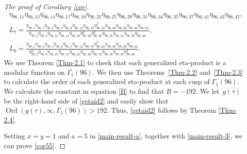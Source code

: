 \documentclass[10pt,a4paper]{amsart}
\numberwithin{equation}{section}
\theoremstyle{definition}
\begin{document}
\begin{proof}[The proof of Corollary \ref{cor}]
\begin{gather*}
{\eta_{96,11}\eta_{96,13}\eta_{96,14}\eta_{96,17}\eta_{96,19}\eta_{96,23}\eta_{96,25}\eta_{96,29}\eta_{96,31}\eta_{96,34}\eta_{96,35}\eta_{96,37}\eta_{96,41}\eta_{96,43}\eta_{96,47}},\\
L_7=\frac{\eta_{96,1}\eta_{96,5}\eta_{96,6}\eta_{96,7}\eta_{96,8}\eta_{96,12}\eta_{96,18}\eta^2_{96,24}\eta_{96,30}\eta_{96,36}\eta_{96,40}\eta_{96,42}}{\eta_{96,2}\eta_{96,4}\eta_{96,10}\eta_{96,14}\eta_{96,20}\eta^2_{96,22}\eta^2_{96,26}\eta_{96,28}\eta_{96,34}\eta_{96,38}\eta_{96,46}},\\
L_8=\frac{\eta_{96,1}\eta_{96,4}\eta_{96,5}\eta_{96,6}\eta_{96,7}\eta_{96,12}\eta_{96,18}\eta^2_{96,24}\eta_{96,30}\eta_{96,36}\eta_{96,42}}{\eta^2_{96,2}\eta_{96,8}\eta_{96,10}\eta_{96,14}\eta_{96,22}\eta_{96,26}\eta_{96,34}\eta_{96,38}\eta_{96,40}\eta^2_{96,46}}.
\end{gather*}
We use Theorem \ref{Thm-2.1} to check that each generalized eta-product is a modular function on $\Gamma_1(96)$. We then use Theorems~\ref{Thm-2.2} and~\ref{Thm-2.3} to calculate the order of each generalized eta-product at each cusp of $\Gamma_1(96)$. We calculate the constant in equation \eqref{B} to find that $B=-192$. We let~$g(\tau)$ be the right-hand side of \eqref{getaid2} and easily show that $\operatorname{Ord}(g(\tau),\infty,\Gamma_1(96)) > 192$. Thus, \eqref{getaid2} follows by Theorem \ref{Thm-2.4}.

Setting $x=y=1$ and $a=5$ in \eqref{main-result-a}, together with \eqref{main-result-3}, we can prove \eqref{cor55}.
\end{proof}
\end{document}
